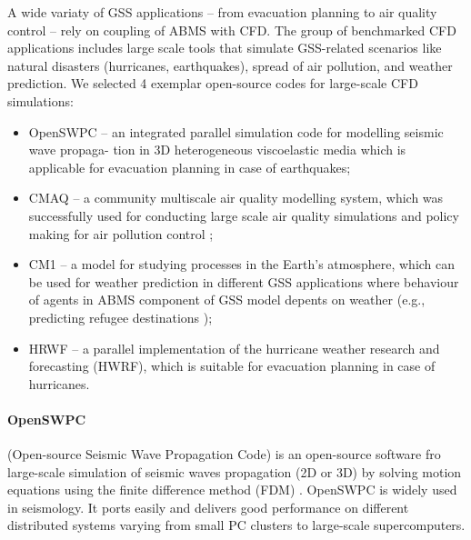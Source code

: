 A wide variaty of GSS applications -- from evacuation planning \cite{2011:Epstein} to air quality control \cite{CHEMEL2014410} –
rely on coupling of ABMS with CFD. The group of benchmarked CFD applications includes large
scale tools that simulate GSS-related scenarios like natural disasters (hurricanes, earthquakes),
spread of air pollution, and weather prediction. We selected 4 exemplar open-source codes for
large-scale CFD simulations:
\begin{itemize}
\item OpenSWPC -- an integrated parallel simulation code for modelling seismic wave propaga-
  tion in 3D heterogeneous viscoelastic media which is applicable for evacuation planning in
  case of earthquakes;
\item CMAQ -- a community multiscale air quality modelling system, which was successfully
  used for conducting large scale air quality simulations and policy making for air pollution
  control \cite{CHEMEL2014410};
\item CM1 -- a model for studying processes in the Earth's atmosphere, which can be used
  for weather prediction in different GSS applications where behaviour of agents in ABMS
  component of GSS model depents on weather (e.g., predicting refugee destinations \cite{Suleimenova2017});
\item HRWF -- a parallel implementation of the hurricane weather research and forecasting (HWRF),
  which is suitable for evacuation planning in case of hurricanes.
\end{itemize}

\paragraph{OpenSWPC} (Open-source Seismic Wave Propagation Code) is an open-source software fro large-scale simulation of seismic waves propagation (2D or 3D) by solving motion equations using the finite difference method (FDM) \cite{OpenSWPC2}. OpenSWPC is widely used in seismology. It ports easily and delivers good performance on different distributed systems varying from small PC clusters to large-scale supercomputers.
\iffalse
Without modifying the code, users can simulate seismic wave propagation using their own speed structure models and the necessary source representations in the input parameter file. The software code is equipped with a frequency-independent damping model based on a generalised Zener (standard linear solid - SLS model) body and an efficiently selected, perfectly matched boundary absorbing layer. It has different modes for the different input data types of the velocity structure model and different source representations, such as single force, torque tensioner and flat frequency, which can be easily selected by input parameters. Common binary data formats, a common network data form (NetCDF), and a seismic analysis code (SAC) are used to input a heterogeneous structure model and simulation results so that users can easily operate their input and output data sets. All codes are written in Fortran 2003 and are available with detailed documents in a public repository.
\fi

